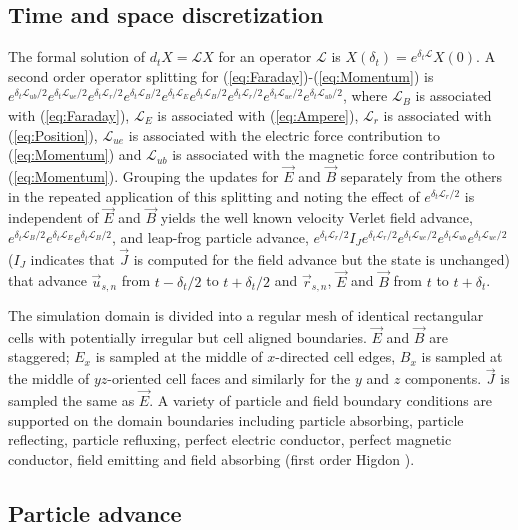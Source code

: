 \documentclass[letter,10pt]{article}
\newcommand{\vecr}{\vec{r}}
\newcommand{\vecu}{\vec{u}}
\newcommand{\vecJ}{\vec{J}}
\newcommand{\vecE}{\vec{E}}
\newcommand{\vecB}{\vec{B}}
\newcommand{\op}{\mathcal{L}}
\newcommand{\Deriv}[2]{d_{#2}#1}
\newcommand{\eq}[1]{(\ref{eq:#1})}
\begin{document}
\subsection{Time and space discretization}

The formal solution of $\Deriv{X}{t} = \op X$ for an operator $\op$ is
$X\left(\delta_t\right) = e^{\delta_t\op} X\left(0\right)$.  A second
order operator splitting \cite{McLachlan_Quispel_2002} for
\eq{Faraday}-\eq{Momentum} is
$e^{\delta_t\op_{ub}/2} e^{\delta_t\op_{ue}/2} e^{\delta_t\op_r/2}
e^{\delta_t\op_B/2}e^{\delta_t\op_E} e^{\delta_t\op_B/2}
e^{\delta_t\op_r/2} e^{\delta_t\op_{ue}/2} e^{\delta_t\op_{ub}/2}$,
where $\op_B$ is associated with \eq{Faraday}, $\op_E$ is associated
with \eq{Ampere}, $\op_r$ is associated with \eq{Position}, $\op_{ue}$
is associated with the electric force contribution to \eq{Momentum}
and $\op_{ub}$ is associated with the magnetic force contribution to
\eq{Momentum}.  Grouping the updates for $\vecE$ and $\vecB$ separately
from the others in the repeated application of this splitting and
noting the effect of $e^{\delta_t\op_r/2}$ is independent of $\vecE$
and $\vecB$ yields the well known velocity Verlet field advance,
$e^{\delta_t\op_B/2} e^{\delta_t\op_E} e^{\delta_t\op_B/2}$, and
leap-frog particle advance, $e^{\delta_t\op_r/2} I_J
e^{\delta_t\op_r/2} e^{\delta_t\op_{ue}/2} e^{\delta_t\op_{ub}}
e^{\delta_t\op_{ue}/2}$ ($I_J$ indicates that $\vecJ$ is computed for
the field advance but the state is unchanged) that advance
$\vecu_{s,n}$ from $t-\delta_t/2$ to $t+\delta_t/2$ and $\vecr_{s,n}$,
$\vecE$ and $\vecB$ from $t$ to $t+\delta_t$.

The simulation domain is divided into a regular mesh of identical
rectangular cells with potentially irregular but cell aligned
boundaries.  $\vecE$ and $\vecB$ are staggered; $E_x$ is sampled at
the middle of $x$-directed cell edges, $B_x$ is sampled at the middle
of $yz$-oriented cell faces and similarly for the $y$ and $z$
components.  $\vecJ$ is sampled the same as $\vecE$.  A variety of
particle and field boundary conditions are supported on the domain
boundaries including particle absorbing, particle reflecting, particle
refluxing, perfect electric conductor, perfect magnetic conductor,
field emitting and field absorbing (first order Higdon
\cite{Higdon_1986}).

\subsection{Particle advance}
\end{document}
